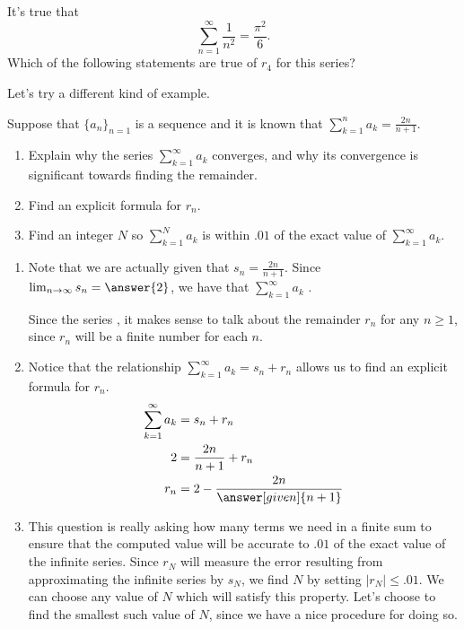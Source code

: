 \documentclass{ximera}
\begin{document}
\begin{question}
It's true that
\[
\sum \limits_{n=1}^\infty \frac{1}{n^2}  = \frac{\pi^2}{6}.
\]
Which of the following statements are true of $r_4$ for this series?
\begin{selectAll}
\end{selectAll}
\end{question}

Let's try a different kind of example.
\begin{example}
Suppose that $\{a_n\}_{n=1}$ is a sequence and it is known that $\sum_{k=1}^{n} a_k = \frac{2n}{n+1}$.  
\begin{enumerate}
    \item Explain why the series $\sum_{k=1}^{\infty} a_k$ converges, and why its convergence is significant towards finding the remainder.
    \item Find an explicit formula for $r_n$.
    \item Find an integer $N$ so $\sum_{k=1}^{N} a_k$ is within $.01$ of the exact value of $\sum_{k=1}^{\infty} a_k$.
\end{enumerate} 

\begin{explanation}
\begin{enumerate}
\item Note that we are actually given that $s_n = \frac{2n}{n+1}$.  Since $\lim_{n \to \infty} s_n = \answer{2}$, we have that $\sum_{k=1}^{\infty} a_k$  .

Since the series , it makes sense to talk about the remainder $r_n$ for any $n \geq 1$, since $r_n$ will be a finite number for each $n$.  

\item Notice that the relationship $\sum_{k=1}^{\infty} a_k = s_n+r_n$ allows us to find an explicit formula for $r_n$.
\begin{align*}
\sum_{k=1}^{\infty} a_k &= s_n+r_n \\
2 &= \frac{2n}{n+1}+r_n \\
r_n &= 2-\frac{2n}{\answer[given]{n+1}}
\end{align*}


\item This question is really asking how many terms we need in a finite sum to ensure that the computed value will be accurate to $.01$ of the exact value of the infinite series.  Since $r_N$ will measure the error resulting from approximating the infinite series by $s_N$, we find $N$ by setting $\vert r_N \vert \leq .01$.  We can choose any value of $N$ which will satisfy this property.  Let's choose to find the smallest such value of $N$, since we have a nice procedure for doing so.


\end{enumerate}
\end{explanation}
\end{example}
\end{document}

